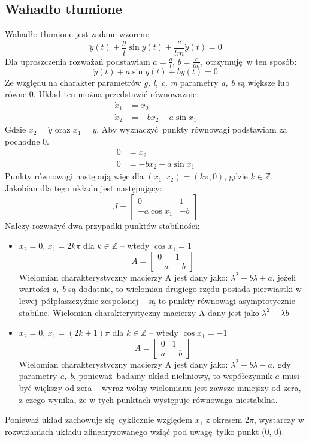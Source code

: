 \documentclass[a4paper, 10pt]{article}
\begin{document}
		\subsection{Wahadło tłumione}
			Wahadło tłumione jest zadane wzorem:
			$$
				\ddot{y}(t) + \frac{g}{l} \sin y(t) + \frac{c}{lm} \dot{y}(t) = 0
			$$
			Dla uproszczenia rozważań podstawiam $a = \frac{g}{l}$, $b = \frac{c}{lm}$, otrzymuję w ten sposób:
			$$
				\ddot{y}(t) + a \sin y(t) + b \dot{y}(t) = 0
			$$
			Ze względu na charakter parametrów \textit{g, l, c, m} parametry \textit{a, b} są większe lub równe 0. Układ ten można przedstawić równoważnie:
			$$
				\begin{aligned}
					\dot{x}_1 & = x_2 \\
					\dot{x}_2 & = - b x_2 - a \sin x_1 
				\end{aligned}
			$$
			Gdzie $x_2 = \dot{y}$ oraz $x_1 = y$. Aby wyznaczyć punkty równowagi podstawiam za pochodne 0.
			$$
				\begin{aligned}
					0 & = x_2 \\
					0 & = - b x_2 - a \sin x_1
				\end{aligned}
			$$
			Punkty równowagi następują więc dla $(x_1, x_2) = (k \pi, 0)$, gdzie $k \in \mathbb{Z}$. Jakobian dla tego układu jest następujący:
			$$
				J = \begin{bmatrix}
					0 & 1 \\
					- a \cos x_1 & -b
				\end{bmatrix}
			$$
			Należy rozważyć dwa przypadki punktów stabilności:
			\begin{itemize}
				\item[] $x_2 = 0$, $x_1 = 2k \pi$ dla $k \in \mathbb{Z}$ -- wtedy $\cos x_1 = 1$
					$$
						A = \begin{bmatrix}
							0 & 1 \\
							- a  & -b
						\end{bmatrix}
					$$
					Wielomian charakterystyczny macierzy A jest dany jako: $\lambda^2 + b\lambda + a$, jeżeli wartości \textit{a, b} są dodatnie, to wielomian drugiego rzędu posiada pierwiastki w lewej półpłaszczyźnie zespolonej -- są to punkty równowagi asymptotycznie stabilne.
					Wielomian charakterystyczny macierzy A dany jest jako $\lambda^2 + \lambda b$
				\item[] $x_2 = 0$, $x_1 = (2k + 1) \pi$ dla $k \in \mathbb{Z}$ -- wtedy $\cos x_1 = -1$
					$$
						A = \begin{bmatrix}
							0 & 1 \\
							a  & -b
						\end{bmatrix}
					$$
					Wielomian charakterystyczny macierzy A jest dany jako: $\lambda^2 + b\lambda - a$, gdy parametry \textit{a, b}, ponieważ badamy układ nieliniowy, to współczynnik $a$ musi być większy od zera -- wyraz wolny wielomianu jest zawsze mniejszy od zera, z czego wynika, że w tych punktach występuje równowaga niestabilna.
			\end{itemize}
			Ponieważ układ zachowuje się cyklicznie względem $x_1$ z okresem $2 \pi$, wystarczy w rozważaniach układu zlinearyzowanego wziąć pod uwagę tylko punkt (0, 0).
\end{document}
